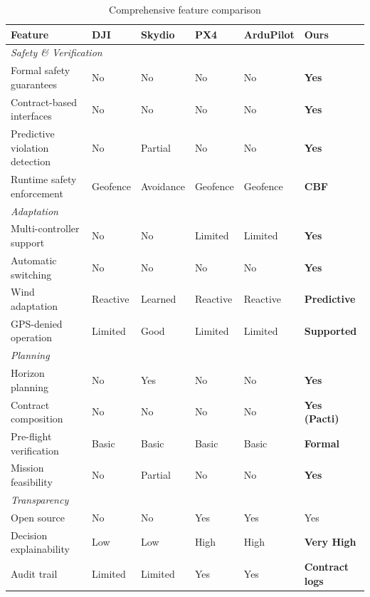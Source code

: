 \begin{table}[htbp]
    \centering
    \caption{Comprehensive feature comparison}
    \label{tab:feature_matrix}
    \footnotesize
    \begin{tabular}{@{}p{4.5cm}p{1.8cm}p{1.8cm}p{1.8cm}p{1.8cm}p{2cm}@{}}
        \toprule
        \textbf{Feature} & \textbf{DJI} & \textbf{Skydio} & \textbf{PX4} & \textbf{ArduPilot} & \textbf{Ours} \\
        \midrule
        \multicolumn{6}{l}{\textit{Safety \& Verification}} \\
        Formal safety guarantees & No & No & No & No & \textbf{Yes} \\
        Contract-based interfaces & No & No & No & No & \textbf{Yes} \\
        Predictive violation detection & No & Partial & No & No & \textbf{Yes} \\
        Runtime safety enforcement & Geofence & Avoidance & Geofence & Geofence & \textbf{CBF} \\
        \midrule
        \multicolumn{6}{l}{\textit{Adaptation}} \\
        Multi-controller support & No & No & Limited & Limited & \textbf{Yes} \\
        Automatic switching & No & No & No & No & \textbf{Yes} \\
        Wind adaptation & Reactive & Learned & Reactive & Reactive & \textbf{Predictive} \\
        GPS-denied operation & Limited & Good & Limited & Limited & \textbf{Supported} \\
        \midrule
        \multicolumn{6}{l}{\textit{Planning}} \\
        Horizon planning & No & Yes & No & No & \textbf{Yes} \\
        Contract composition & No & No & No & No & \textbf{Yes (Pacti)} \\
        Pre-flight verification & Basic & Basic & Basic & Basic & \textbf{Formal} \\
        Mission feasibility & No & Partial & No & No & \textbf{Yes} \\
        \midrule
        \multicolumn{6}{l}{\textit{Transparency}} \\
        Open source & No & No & Yes & Yes & Yes \\
        Decision explainability & Low & Low & High & High & \textbf{Very High} \\
        Audit trail & Limited & Limited & Yes & Yes & \textbf{Contract logs} \\
        \bottomrule
    \end{tabular}
\end{table}

